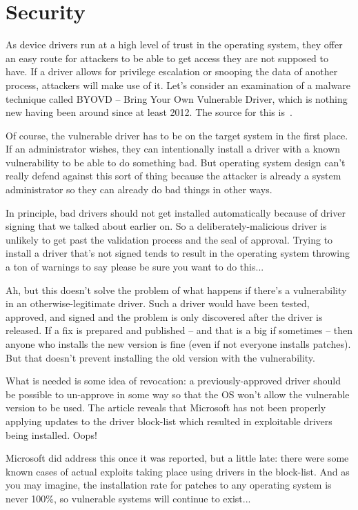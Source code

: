 \section*{Security}
As device drivers run at a high level of trust in the operating system, they offer an easy route for attackers to be able to get access they are not supposed to have. If a driver allows for privilege escalation or snooping the data of another process, attackers will make use of it. Let's consider an examination of a malware technique called BYOVD -- Bring Your Own Vulnerable Driver, which is nothing new having been around since at least 2012. The source for this is~\cite{byovd}.

Of course, the vulnerable driver has to be on the target system in the first place. If an administrator wishes, they can intentionally install a driver with a known vulnerability to be able to do something bad. But operating system design can't really defend against this sort of thing because the attacker is already a system administrator so they can already do bad things in other ways. 

In principle, bad drivers should not get installed automatically because of driver signing that we talked about earlier on. So a deliberately-malicious driver is unlikely to get past the validation process and the seal of approval. Trying to install a driver that's not signed tends to result in the operating system throwing a ton of warnings to say please be sure you want to do this...

Ah, but this doesn't solve the problem of what happens if there's a vulnerability in an otherwise-legitimate driver. Such a driver would have been tested, approved, and signed and the problem is only discovered after the driver is released. If a fix is prepared and published -- and that is a big if sometimes -- then anyone who installs the new version is fine (even if not everyone installs patches). But that doesn't prevent installing the old version with the vulnerability.

What is needed is some idea of revocation: a previously-approved driver should be possible to un-approve in some way so that the OS won't allow the vulnerable version to be used. The article reveals that Microsoft has not been properly applying updates to the driver block-list which resulted in exploitable drivers being installed. Oops!

Microsoft did address this once it was reported, but a little late: there were some known cases of actual exploits taking place using drivers in the block-list. And as you may imagine, the installation rate for patches to any operating system is never 100\%, so vulnerable systems will continue to exist...



